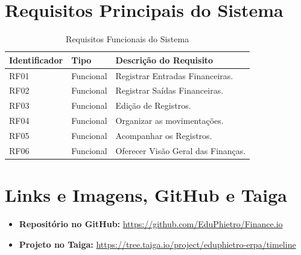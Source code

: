\documentclass[11pt, a4paper]{article}
\begin{document}
\section{Requisitos Principais do Sistema}

\begin{table}[h]
\centering
\caption{Requisitos Funcionais do Sistema}
\vspace{0.2cm}
\begin{tabular}{lll}
\toprule
\textbf{Identificador} & \textbf{Tipo} & \textbf{Descrição do Requisito} \\
\midrule
RF01 & Funcional & Registrar Entradas Financeiras. \\
RF02 & Funcional & Registrar Saídas Financeiras. \\
RF03 & Funcional & Edição de Registros. \\
RF04 & Funcional & Organizar as movimentações. \\
RF05 & Funcional & Acompanhar os Registros. \\
RF06 & Funcional & Oferecer Visão Geral das Finanças. \\
\bottomrule
\end{tabular}
\end{table}

\section{Links e Imagens, GitHub e Taiga}

\begin{itemize}
    \item \textbf{Repositório no GitHub:} \url{https://github.com/EduPhietro/Finance.io}
    \item \textbf{Projeto no Taiga:} \url{https://tree.taiga.io/project/eduphietro-erpa/timeline}
\end{itemize}
\end{document}
